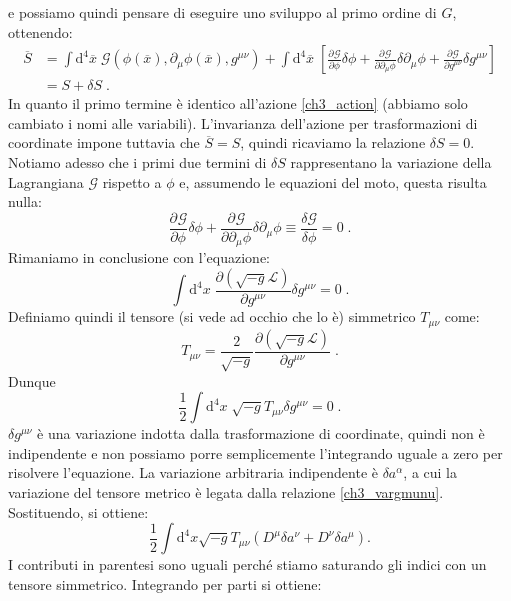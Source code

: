 \documentclass[12pt,a4paper]{report}
\theoremstyle{definition}
\newcommand{\pdev}[3][]{\frac{\partial^{#1} #2}{\partial #3^{#1}}}
\newcommand{\lag}{\mathcal{L}}
\newcommand{\diff}[1][]{\mathrm{d}#1}
\begin{document}
e possiamo quindi pensare di eseguire uno sviluppo al primo ordine di $G$, ottenendo:
\begin{align*}
\overline{S}&=\int\diff^{4}{\overline{x}}\;\mathcal{G}(\phi(\overline{x}),\partial_{\mu}\phi(\overline{x}),g^{\mu\nu})+\int\diff^4{\overline{x}}\;\left[\pdev{\mathcal{G}}{\phi}\delta\phi+\pdev{\mathcal{G}}{\partial_{\mu}\phi}\delta\partial_{\mu}\phi+\frac{\partial \mathcal{G}}{\partial g^{\mu\nu}}\delta g^{\mu\nu}\right] \\
&= S+\delta S\;.
\end{align*}
In quanto il primo termine è identico all'azione \eqref{ch3_action} (abbiamo solo cambiato i nomi alle variabili). L'invarianza dell'azione per trasformazioni di coordinate impone tuttavia che $\overline{S}=S$, quindi ricaviamo la relazione $\delta S=0$. Notiamo adesso che i primi due termini di $\delta S$ rappresentano la variazione della Lagrangiana $\mathcal{G}$ rispetto a $\phi$ e, assumendo le equazioni del moto, questa risulta nulla:
\begin{equation}
\pdev{\mathcal{G}}{\phi}\delta\phi+\pdev{\mathcal{G}}{\partial_{\mu}\phi}\delta\partial_{\mu}\phi\equiv\frac{\delta \mathcal{G}}{\delta\phi}=0\;.
\end{equation}
Rimaniamo in conclusione con l'equazione:
\begin{equation}
\int\diff^4{x}\;\frac{\partial (\sqrt{-g}\lag)}{\partial g^{\mu\nu}}\delta g^{\mu\nu}=0\;.
\end{equation}
Definiamo quindi il tensore (si vede ad occhio che lo è) simmetrico $T_{\mu\nu}$ come:
\begin{equation}
T_{\mu\nu}=\frac{2}{\sqrt{-g}}\frac{\partial(\sqrt{-g}\lag)}{\partial g^{\mu\nu}}\;. \label{ch3_tmunudef}
\end{equation}
Dunque
\begin{equation}
\frac{1}{2}\int\diff^4{x}\;\sqrt{-g}T_{\mu\nu}\delta g^{\mu\nu}=0\;.
\end{equation}
$\delta g^{\mu\nu}$ è una variazione indotta dalla trasformazione di coordinate, quindi non è indipendente e non possiamo porre semplicemente l'integrando uguale a zero per risolvere l'equazione. La variazione arbitraria indipendente è $\delta a^{\alpha}$, a cui la variazione del tensore metrico è legata dalla relazione \eqref{ch3_vargmunu}. Sostituendo, si ottiene:
$$
\frac{1}{2}\int\diff^4{x}\sqrt{-g}T_{\mu\nu}(D^{\mu}\delta a^{\nu}+D^{\nu}\delta a^{\mu}).
$$
I contributi in parentesi sono uguali perché stiamo saturando gli indici con un tensore simmetrico. Integrando per parti si ottiene:
\end{document}
